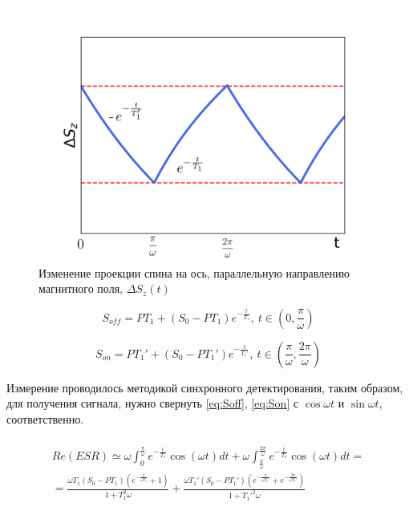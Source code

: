 \documentclass[10pt]{article}
\begin{document}
\begin{figure}[h]
	\includegraphics[scale = 0.4]{excitation.png}
	\caption{Изменение проекции спина на ось, параллельную направлению магнитного поля, $\Delta S_{z}(t)$}
	\label{fig:excitation}
\end{figure}

\begin{equation}\label{eq:Soff}
S_{off} = PT_1 + (S_0 - PT_1)e^{-\frac{t}{T_1}}, \ t \in \left(  0, \frac{\pi}{\omega} \right) 
\end{equation}

\begin{equation}\label{eq:Son}
S_{on} = PT_1' + (S_0 - PT_1')e^{-\frac{t}{T_1'}}, \ t \in \left(  \frac{\pi}{\omega}, \frac{2\pi}{\omega} \right) 
\end{equation}

Измерение проводилось методикой синхронного детектирования, таким образом, для получения сигнала, нужно свернуть \eqref{eq:Soff}, \eqref{eq:Son} с $\cos{\omega t}$ и $\sin{\omega t}$, соответственно.

\footnotesize
\begin{eqnarray}\label{eq:ESRcos}
\\
Re(ESR) \simeq \omega\int_{0}^{\frac{\pi}{\omega}} e^{-\frac{t}{T_1}} \cos(\omega t)dt + \omega \int_{\frac{\pi}{\omega}}^{\frac{2 \pi}{\omega}} e^{-\frac{t}{T_1}} \cos(\omega t)dt = \\
= \frac{\omega T_1 \left( S_0 - PT_1 \right) \left( e^{-\frac{\pi}{\omega T_1}} + 1 \right) }{1 + T_1^2 \omega} + \frac{\omega T_1' \left( S_0 - PT_1' \right) \left( e^{-\frac{\pi}{\omega T_1'}} + e^{-\frac{2 \pi}{\omega T_1'}} \right) }{1 + T_1'^2 \omega}
\end{eqnarray}
\end{document}
